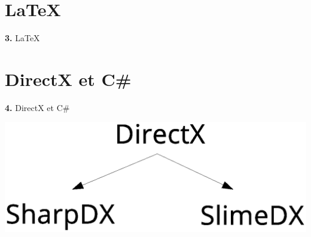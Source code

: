 \documentclass[12pt]{beamer}
\begin{document}
\section{\LaTeX}

\begingroup
{}
\begin{frame}
    \begin{center}
        \vspace{1cm}
        {\Huge\color{background} \textbf{3.} {\selectfont\LaTeX}}
    \end{center}
\end{frame}
\endgroup

\section{DirectX et C\#}

\begingroup
{}
\begin{frame}
    \begin{center}
        \vspace{1cm}
        {\Large\color{background} \textbf{4.} DirectX et C\#}
    \end{center}
\end{frame}
\endgroup

\begin{frame}
    \begin{center}
        \includegraphics[scale=0.35]{img/arys1.eps}
    \end{center}
\end{frame}
\end{document}

